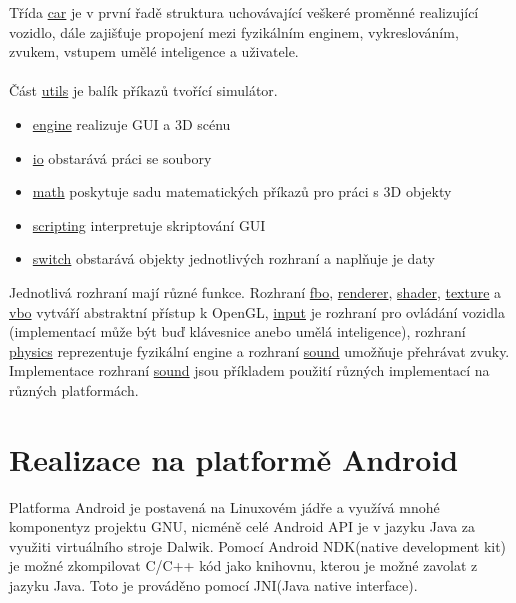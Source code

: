 \documentclass[11pt,twoside,a4paper]{book}
\begin{document}
Třída \ul{car} je v první řadě struktura uchovávající veškeré proměnné realizující vozidlo, dále zajišťuje propojení mezi fyzikálním enginem, vykreslováním, zvukem, vstupem umělé inteligence a uživatele.
\\ \\
Část \ul{utils} je balík příkazů tvořící simulátor.
\begin{itemize}
\item \ul{engine} realizuje GUI a 3D scénu
\item \ul{io} obstarává práci se soubory
\item \ul{math} poskytuje sadu matematických příkazů pro práci s 3D objekty
\item \ul{scripting} interpretuje skriptování GUI
\item \ul{switch} obstarává objekty jednotlivých rozhraní a naplňuje je daty
\end{itemize}

Jednotlivá rozhraní mají různé funkce. Rozhraní \ul{fbo}, \ul{renderer}, \ul{shader}, \ul{texture} a \ul{vbo} vytváří abstraktní přístup k OpenGL, \ul{input} je rozhraní pro ovládání vozidla (implementací může být buď klávesnice anebo umělá inteligence), rozhraní \ul{physics} reprezentuje fyzikální engine a rozhraní \ul{sound} umožňuje přehrávat zvuky. Implementace rozhraní \ul{sound} jsou příkladem použití různých implementací na různých platformách.

\section{Realizace na platformě Android}
Platforma Android je postavená na Linuxovém jádře a využívá mnohé komponenty\linebreak z projektu GNU, nicméně celé Android API je v jazyku Java za využiti virtuálního stroje Dalwik. Pomocí Android NDK(native development kit) je možné zkompilovat C/C++ kód jako knihovnu, kterou je možné zavolat z jazyku Java. Toto je prováděno pomocí JNI(Java native interface).
\end{document}
